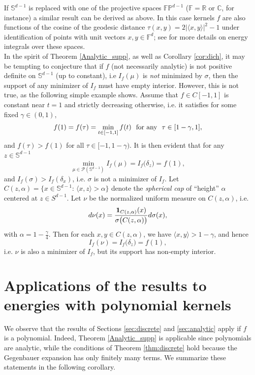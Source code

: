 \documentclass[11pt, leqno]{amsart}
\def\C{\mathbb C}
\def\F{\mathbb F}
\def\FP{\mathbb {FP}}
\def\R{\mathbb R}
\def\S{\mathbb S}
\theoremstyle{definition}
\numberwithin{equation}{section}
\begin{document}
If $\S^{d-1}$ is replaced with one of the projective spaces $\FP^{d-1}$ ($\F = \R$ or  $\C$, for instance) a similar result can be derived as above. In this case kernels $f$ are also functions of the cosine of the geodesic distance $\tau(x,y)=2|\langle x,y\rangle|^2-1$ under identification of points with unit vectors $x,y\in\F^{d}$; see \cite{BGMPV} for more details on energy integrals over these spaces. \\


In the spirit of Theorem \ref{Analytic_supp}, as well as  Corollary \ref{cor:dich}, it may be tempting to conjecture that if $f$ (not necessarily analytic) is not positive definite on $\S^{d-1}$ (up to constant), i.e $I_f(\mu)$ is {\em{not}} minimized by $\sigma$, then the support of any minimizer of $I_f$ must have empty interior. However, this is not true, as the following simple example shows. Assume that $f\in C[-1,1]$  is constant near $t=1$ and strictly decreasing otherwise, i.e. it satisfies for some fixed $\gamma  \in (0,1)$, $$ f(1) = f(\tau) = \min_{t\in[-1,1]} f(t) \,\, \textup{ for any }\,\, \tau \in [1- \gamma,1],$$ and $f(\tau) > f(1)$ for all $\tau \in [-1, 1- \gamma)$. It is then evident that for any $z \in\S^{d-1}$  $$ \min_{\mu \in \mathcal P (\S^{d-1}) } I_f (\mu ) = I_f \big(\delta_z \big) = f(1),$$
and  
$I_f (\sigma) > I_f (\delta_x)$, i.e. $\sigma $ is not a minimizer of $I_f$. Let $C(z, \alpha) = \{ x\in \S^{d-1}:\, \langle x,z \rangle >\alpha \} $ denote the {\em{spherical cap}} of ``height'' $\alpha $ centered at $z\in S^{d-1}$. Let $\nu$ be the  normalized uniform measure on $C(z,\alpha)$, i.e.  $$d\nu (x) = \frac{{\bf{1}}_{C(z,\alpha)} (x)}{\sigma \big( C(z,\alpha) \big)} d\sigma (x), $$ with $\alpha = 1 - \frac{\gamma}{4}$. Then for each $x,y \in C(z,\alpha)$, we have $\langle x,y \rangle  > 1-\gamma$, and hence $$ I_f (\nu ) = I_f \big(\delta_z\big) = f(1),$$ i.e. $\nu$ is also a minimizer of $I_f$, but its support has non-empty interior.\\




\section{Applications of the results to energies with polynomial kernels}\label{sec:poly}

We observe that the results of Sections \ref{sec:discrete} and \ref{sec:analytic} apply  if $f$ is a polynomial.  Indeed, Theorem \ref{Analytic_supp} is applicable since polynomials are analytic, while  the conditions of Theorem \ref{thm:discrete} hold because the Gegenbauer expansion  has only finitely many terms. We summarize these statements in the following corollary. 
\end{document}
